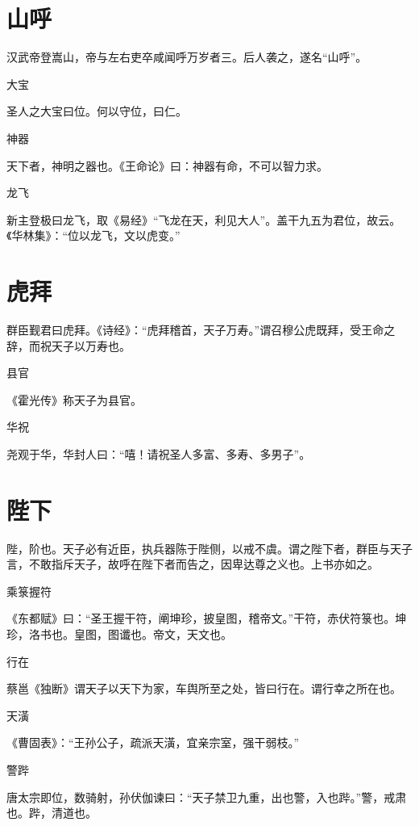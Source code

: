 \documentclass[a4paper,12pt,UTF8,twoside]{ctexbook}
\begin{document}
    \section{山呼}
    
    汉武帝登嵩山，帝与左右吏卒咸闻呼万岁者三。后人袭之，遂名“山呼”。
    
    大宝
    
    圣人之大宝曰位。何以守位，曰仁。
    
    神器
    
    天下者，神明之器也。《王命论》曰：神器有命，不可以智力求。
    
    龙飞
    
    新主登极曰龙飞，取《易经》“飞龙在天，利见大人”。盖干九五为君位，故云。《华林集》：“位以龙飞，文以虎变。”
    
    \section{虎拜}
    
    群臣觐君曰虎拜。《诗经》：“虎拜稽首，天子万寿。”谓召穆公虎既拜，受王命之辞，而祝天子以万寿也。
    
    县官
    
    《霍光传》称天子为县官。
    
    华祝
    
    尧观于华，华封人曰：“嘻！请祝圣人多富、多寿、多男子”。
    
    \section{陛下}
    
    陛，阶也。天子必有近臣，执兵器陈于陛侧，以戒不虞。谓之陛下者，群臣与天子言，不敢指斥天子，故呼在陛下者而告之，因卑达尊之义也。上书亦如之。
    
    乘箓握符
    
    《东都赋》曰：“圣王握干符，阐坤珍，披皇图，稽帝文。”干符，赤伏符箓也。坤珍，洛书也。皇图，图谶也。帝文，天文也。
    
    行在
    
    蔡邕《独断》谓天子以天下为家，车舆所至之处，皆曰行在。谓行幸之所在也。
    
    天潢
    
    《曹固表》：“王孙公子，疏派天潢，宜亲宗室，强干弱枝。”
    
    警跸
    
    唐太宗即位，数骑射，孙伏伽谏曰：“天子禁卫九重，出也警，入也跸。”警，戒肃也。跸，清道也。
    
\end{document}
